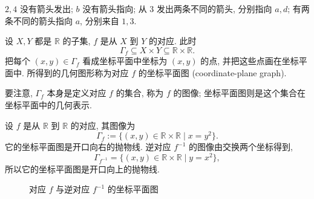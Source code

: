 \documentclass[usesamecnt, thmcnt=section, lang=cn, newtx, 10pt, scheme=chinese]{elegantbook}
\begin{document}
\begin{solution}
$2,4$ 没有箭头发出; $b$ 没有箭头指向; 从 $3$ 发出两条不同的箭头, 分别指向 $a,d$; 有两条不同的箭头指向 $a$, 分别来自 $1,3$.

\end{solution}

\begin{definition}[坐标平面图]\label{def:corr-coordinate-graph}
设 $X,Y$ 都是 $\mathbb R$ 的子集, $f$ 是从 $X$ 到 $Y$ 的对应. 此时
\[
 \Gamma_f\subseteq X\times Y\subseteq\mathbb R\times\mathbb R.
\]
把每个 $(x,y)\in\Gamma_f$ 看成坐标平面中坐标为 $(x,y)$ 的点, 并把这些点画在坐标平面中. 所得到的几何图形称为对应 $f$ 的{\color{blue}坐标平面图 (coordinate-plane graph)}.

要注意, $\Gamma_f$ 本身是定义对应 $f$ 的集合, 称为 $f$ 的图像; 坐标平面图则是这个集合在坐标平面中的几何表示.
\end{definition}

\begin{instance}
设 $f$ 是从 $\mathbb R$ 到 $\mathbb R$ 的对应, 其图像为
\[
 \Gamma_f:=\{(x,y)\in\mathbb R\times\mathbb R\mid x=y^2\}.
\]
它的坐标平面图是开口向右的抛物线. 逆对应 $f^{-1}$ 的图像由交换两个坐标得到,
\[
 \Gamma_{f^{-1}}
 =\{(x,y)\in\mathbb R\times\mathbb R\mid y=x^2\},
\]
所以它的坐标平面图是开口向上的抛物线.

\begin{figure}[H]
\centering
\begin{minipage}{0.45\textwidth}
\centering
{}
\end{minipage}
\hfill
\begin{minipage}{0.45\textwidth}
\centering
{}
\end{minipage}
\caption{对应 $f$ 与逆对应 $f^{-1}$ 的坐标平面图}
\label{fig:corr-coordinate-graph}
\end{figure}
\end{instance}
\end{document}
